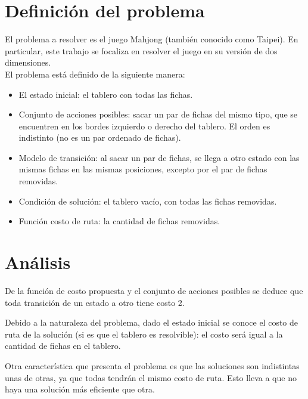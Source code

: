 \documentclass[a4paper,10pt]{article}
\begin{document}
\setcounter{page}{1}


\section{Definición del problema}

    El problema a resolver es el juego Mahjong (también conocido como Taipei). En particular, este trabajo se focaliza en resolver el juego en su versión de dos dimensiones. \\

    El problema está definido de la siguiente manera:

    \begin{itemize}
        \item El estado inicial: el tablero con todas las fichas.
        \item Conjunto de acciones posibles: sacar un par de fichas del mismo tipo, que se encuentren en los bordes izquierdo o derecho del tablero. El orden es indistinto (no es un par ordenado de fichas).
        \item Modelo de transición: al sacar un par de fichas, se llega a otro estado con las mismas fichas en las mismas posiciones, excepto por el par de fichas removidas.
        \item Condición de solución: el tablero vacío, con todas las fichas removidas.
        \item Función costo de ruta: la cantidad de fichas removidas.
    \end{itemize}

\section{Análisis}

    \label{sec:problem_properties}

    De la función de costo propuesta y el conjunto de acciones posibles se deduce que toda transición de un estado a otro tiene costo 2.

    Debido a la naturaleza del problema, dado el estado inicial se conoce el costo de ruta de la solución (si es que el tablero es resolvible): el costo será igual a la cantidad de fichas en el tablero.

    Otra característica que presenta el problema es que las soluciones son indistintas unas de otras, ya que todas tendrán el mismo costo de ruta. Esto lleva a que no haya una solución más eficiente que otra.
\end{document}
